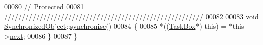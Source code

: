 \begin{DoxyCode}
00080     \textcolor{comment}{// Protected}
00081     \textcolor{comment}{////////////////////////////////////////////////////////}
00082 
\hypertarget{_synchronized_object_8cpp_source_l00083}{}\hyperlink{classdsf_1_1_synchronized_object_a4e200d7b3508db98f09c6fe547f46cdb}{00083}     \textcolor{keywordtype}{void} \hyperlink{namespacedsf_aa16e735f29587f4485b56fc46746f7a9}{SynchronizedObject}::\hyperlink{namespacedsf_aa16e735f29587f4485b56fc46746f7a9}{synchronise}()
00084     \{
00085         *((\hyperlink{namespacedsf_aa16e735f29587f4485b56fc46746f7a9}{TaskBox}*) \textcolor{keyword}{this}) = *\textcolor{keyword}{this}->\hyperlink{namespacedsf_aa16e735f29587f4485b56fc46746f7a9}{next};
00086     \}
00087 \}
\end{DoxyCode}
